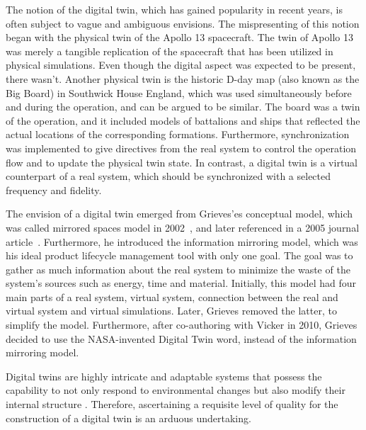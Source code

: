 \documentclass{llncs}
\begin{document}
    The notion of the digital twin, which has gained popularity in 
    recent years, is often subject to vague and ambiguous envisions\cite{Review1}.
    The mispresenting of this notion began with the physical twin of the Apollo 13 spacecraft. 
    The twin of Apollo 13 was merely a tangible replication of the spacecraft that has been utilized in physical simulations. 
    Even though the digital aspect was expected to be present, there wasn't\cite{GrievesApollo13}.
    Another physical twin is the historic D-day map (also known as the Big Board) in Southwick House England, 
    which was used simultaneously before and during the operation, and can be argued to be similar. 
    The board was a twin of the operation, and it included models of battalions and ships that reflected the actual 
    locations of the corresponding formations. Furthermore, synchronization was 
    implemented to give directives from the real system to control the operation 
    flow and to update the physical twin state\cite{AMRC}.
    In contrast, a digital twin is a virtual counterpart of a real system, which should 
    be synchronized with a selected frequency and fidelity\cite{Review1,Review2,digitaltwinconsortium2022}.
    
    The envision of a digital twin emerged from Grieves'es conceptual model, which was called mirrored spaces model in 2002~\cite{Originsofdigitaltwinconcept},
    and later referenced in a 2005 journal article~\cite{2005JournayArticle}. 
    Furthermore, he introduced the information mirroring model, which was his ideal product lifecycle management tool with only one goal. 
    The goal was to gather as much information about the real system to minimize the waste of the system's sources such as energy, 
    time and material. Initially, this model had four main parts of a real system, 
    virtual system, connection between the real and virtual system and virtual simulations\cite{GrievesPLMBook}. 
    Later, Grieves removed the latter, to simplify the model\cite{Originsofdigitaltwinconcept}. Furthermore, after co-authoring with Vicker in 2010, 
    Grieves decided to use the NASA-invented Digital Twin word, instead of the information mirroring model\cite{Originsofdigitaltwinconcept}.
        
    Digital twins are highly intricate and adaptable systems that possess the capability to not only respond to environmental 
    changes but also modify their internal structure \cite{ZHANGUPDATEMETHOD,MobusSystemTheory}. Therefore, ascertaining a 
    requisite level of quality for the construction of a digital twin is an arduous undertaking.
\end{document}
